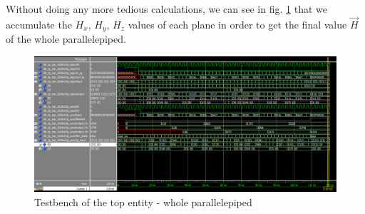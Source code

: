 Without doing any more tedious calculations, we can see in fig. \ref{tb_3d_acc} that we accumulate the $ H_x $, $H_y$, $H_z$ values of each plane in order to get the final value\textbf{  $ \overrightarrow{H} $ } of the whole parallelepiped.
\begin{figure}[h]
	\centering
	\includegraphics[width=\textwidth]{imm/3d/tb_3d_acc.png}  
	\caption{Testbench of the top entity - whole parallelepiped}
	\label{tb_3d_acc}
\end{figure}
\clearpage
\newpage 

